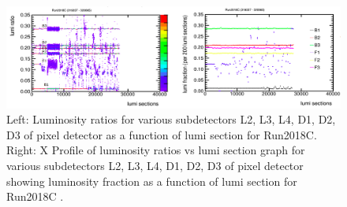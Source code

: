 \begin{figure}[H]
  \centering
  \includegraphics[width=1\columnwidth]{./tfkx3-uyzgt.png}
  \caption{Left: Luminosity ratios for various subdetectors L2, L3, L4, D1, D2, D3 of pixel detector as a function of lumi section for Run2018C. Right: X Profile of luminosity ratios vs lumi section graph for various subdetectors L2, L3, L4, D1, D2, D3 of pixel detector showing luminosity fraction as a function of lumi section for Run2018C \cite{lumidpg}.}
  \label{fig:CMS}
\end{figure}




